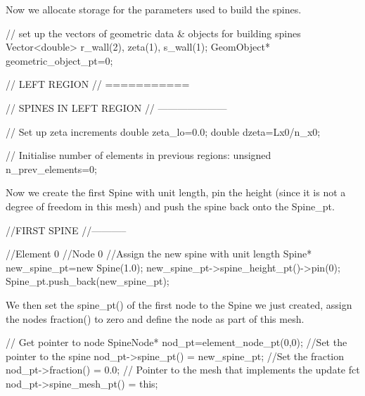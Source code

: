 Now we allocate storage for the parameters used to build the spines.


\begin{DoxyCodeInclude}


 \textcolor{comment}{// set up the vectors of geometric data & objects for building spines}
 Vector<double> r\_wall(2), zeta(1), s\_wall(1);
 GeomObject* geometric\_object\_pt=0;

 \textcolor{comment}{// LEFT REGION}
 \textcolor{comment}{// ===========}

 \textcolor{comment}{// SPINES IN LEFT REGION}
 \textcolor{comment}{// ---------------------}

 \textcolor{comment}{// Set up zeta increments}
 \textcolor{keywordtype}{double} zeta\_lo=0.0;
 \textcolor{keywordtype}{double} dzeta=Lx0/n\_x0;

 \textcolor{comment}{// Initialise number of elements in previous regions:}
 \textcolor{keywordtype}{unsigned} n\_prev\_elements=0;

\end{DoxyCodeInclude}


Now we create the first Spine with unit length, pin the height (since it is not a degree of freedom in this mesh) and push the spine back onto the {\ttfamily Spine\+\_\+pt}.


\begin{DoxyCodeInclude}


 \textcolor{comment}{//FIRST SPINE}
 \textcolor{comment}{//-----------}

 \textcolor{comment}{//Element 0}
 \textcolor{comment}{//Node 0}
 \textcolor{comment}{//Assign the new spine with unit length}
 Spine* new\_spine\_pt=\textcolor{keyword}{new} Spine(1.0);
 new\_spine\_pt->spine\_height\_pt()->pin(0);
 Spine\_pt.push\_back(new\_spine\_pt);

\end{DoxyCodeInclude}


We then set the {\ttfamily spine\+\_\+pt()} of the first node to the Spine we just created, assign the nodes {\ttfamily fraction()} to zero and define the node as part of this mesh.


\begin{DoxyCodeInclude}

 \textcolor{comment}{// Get pointer to node}
 SpineNode* nod\_pt=element\_node\_pt(0,0);
 \textcolor{comment}{//Set the pointer to the spine}
 nod\_pt->spine\_pt() = new\_spine\_pt;
 \textcolor{comment}{//Set the fraction}
 nod\_pt->fraction() = 0.0;
 \textcolor{comment}{// Pointer to the mesh that implements the update fct}
 nod\_pt->spine\_mesh\_pt() = \textcolor{keyword}{this}; 

\end{DoxyCodeInclude}


